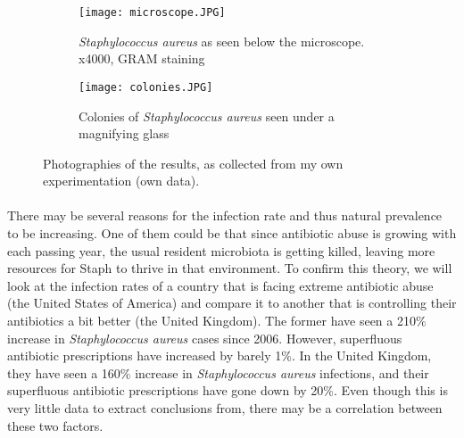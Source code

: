 \begin{figure}[H]\centering\begin{subfigure}[b]{0.4\linewidth}\texttt{[image: microscope.JPG]}\caption{\emph{Staphylococcus aureus} as seen below the microscope. x4000, GRAM staining}\end{subfigure}\begin{subfigure}[b]{0.4\linewidth}\texttt{[image: colonies.JPG]}\caption{Colonies of \emph{Staphylococcus aureus} seen under a magnifying glass}\end{subfigure}\caption{Photographies of the results, as collected from my own experimentation (own data).}\end{figure}\paragraph{}There may be several reasons for the infection rate and thus natural prevalence to be increasing. One of them could be that since antibiotic abuse is growing with each passing year, the usual resident microbiota is getting killed, leaving more resources for Staph to thrive in that environment. To confirm this theory, we will look at the infection rates of a country that is facing extreme antibiotic abuse (the United States of America) and compare it to another that is controlling their antibiotics a bit better (the United Kingdom). The former have seen a 210\% increase in \emph{Staphylococcus aureus} cases since 2006. However, superfluous antibiotic prescriptions have increased by barely 1\%\cite{baggsEstimatingNationalTrends2016}. In the United Kingdom, they have seen a 160\% increase in \emph{Staphylococcus aureus} infections\cite{englandMSSABacteraemiaAnnual2021}, and their superfluous antibiotic prescriptions have gone down by 20\%. Even though this is very little data to extract conclusions from, there may be a correlation between these two factors.
